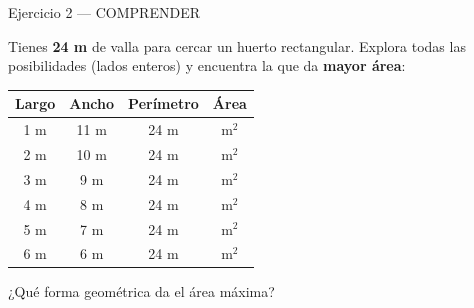 \documentclass[aspectratio=169, 10pt, spanish]{beamer}
\begin{document}
\begin{frame}{Ejercicio 2 — COMPRENDER }
  \begin{comprenderbox}
    Tienes \textbf{24 m} de valla para cercar un huerto rectangular.
    Explora todas las posibilidades (lados enteros) y encuentra
    la que da \textbf{mayor área}:

    \vspace{0.15cm}
    \AlmFontSmall
    \begin{center}
    \begin{tabular}{|c|c|c|c|}
      \hline
      \rowcolor{AlmAzul!15}
      \textbf{Largo} & \textbf{Ancho} & \textbf{Perímetro} & \textbf{Área} \\
      \hline
      1 m & 11 m & 24 m & \phantom{000} m$^2$ \\
      2 m & 10 m & 24 m & \phantom{000} m$^2$ \\
      3 m &  9 m & 24 m & \phantom{000} m$^2$ \\
      4 m &  8 m & 24 m & \phantom{000} m$^2$ \\
      5 m &  7 m & 24 m & \phantom{000} m$^2$ \\
      6 m &  6 m & 24 m & \phantom{000} m$^2$ \\
      \hline
    \end{tabular}
    \end{center}

    ¿Qué forma geométrica da el área máxima?
  \end{comprenderbox}
\end{frame}

\end{document}
